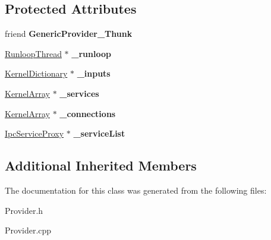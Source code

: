 \subsection*{Protected Attributes}
\begin{DoxyCompactItemize}
\item 
\mbox{\label{class_generic_provider_aedf53462a351ca88b8fd841f27394ee2}} 
friend {\bfseries Generic\+Provider\+\_\+\+Thunk}
\item 
\mbox{\label{class_generic_provider_a896e89cd9ab7ce816ea4b9f1dacf539a}} 
\hyperlink{class_runloop_thread}{Runloop\+Thread} $\ast$ {\bfseries \+\_\+runloop}
\item 
\mbox{\label{class_generic_provider_aa9627c4f6cef973632dad341f44c6bed}} 
\hyperlink{class_kernel_dictionary}{Kernel\+Dictionary} $\ast$ {\bfseries \+\_\+inputs}
\item 
\mbox{\label{class_generic_provider_a6e09a8d8f15b7ca6904f39e2321e0792}} 
\hyperlink{class_kernel_array}{Kernel\+Array} $\ast$ {\bfseries \+\_\+services}
\item 
\mbox{\label{class_generic_provider_a311a7921fcdd59fa42f3ee2748353c61}} 
\hyperlink{class_kernel_array}{Kernel\+Array} $\ast$ {\bfseries \+\_\+connections}
\item 
\mbox{\label{class_generic_provider_a06edbbc5a4d2a9428d42c85f0d05a456}} 
\hyperlink{class_ipc_service_proxy}{Ipc\+Service\+Proxy} $\ast$ {\bfseries \+\_\+service\+List}
\end{DoxyCompactItemize}
\subsection*{Additional Inherited Members}


The documentation for this class was generated from the following files\+:\begin{DoxyCompactItemize}
\item 
Provider.\+h\item 
Provider.\+cpp\end{DoxyCompactItemize}

